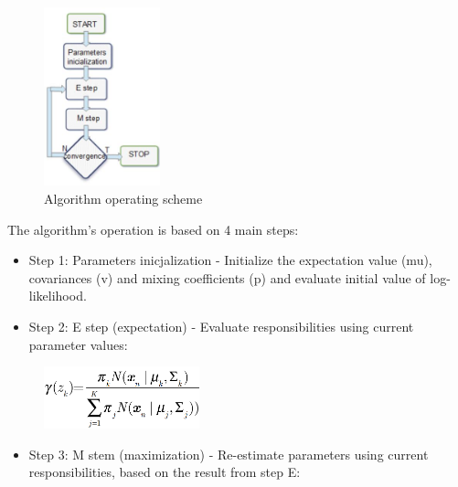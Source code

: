 \begin{figure}[H]
\centering{}\includegraphics[width=0.3\textwidth]{figures/Module_09/m09_20}\caption{Algorithm operating scheme  \label{fig:figures/m09_20}}
\end{figure}

The algorithm's operation is based on 4 main steps:

\begin{itemize}
	\item Step 1: Parameters inicjalization - Initialize the expectation value (mu), covariances (v) and mixing coefficients (p) and evaluate initial value of log-likelihood.
	\item Step 2: E step (expectation) - Evaluate responsibilities using current parameter values:
\end{itemize}

\begin{figure}[H]
\centering{}\includegraphics[width=0.4\textwidth]{figures/Module_09/m09_21}
\end{figure}

\begin{itemize}
	\item Step 3: M stem (maximization) - Re-estimate parameters using current responsibilities, based on the result from step E:
\end{itemize}

